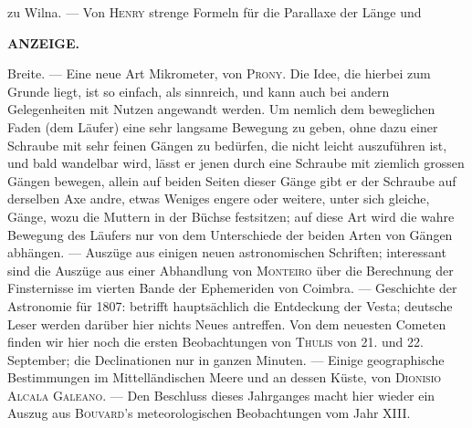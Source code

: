 zu Wilna. --- Von \textsc{Henry} strenge Formeln für die Parallaxe der Länge und\par
\clearpage
\thispagestyle{empty}
\noindent{}%
%
\parbox[t]{\dimexpr\linewidth-24mm\relax}{\centering\footnotesize\bfseries ANZEIGE.\par}%
\makebox[12mm][r]{}\par\nobreak\medskip
\noindent Breite. --- Eine neue Art Mikrometer, von \textsc{Prony}. Die Idee, die hierbei zum Grunde liegt, ist so einfach, als sinnreich, und kann auch bei andern Gelegenheiten mit Nutzen angewandt werden. Um nemlich dem beweglichen Faden (dem Läufer) eine sehr langsame Bewegung zu geben, ohne dazu einer Schraube mit sehr feinen Gängen zu bedürfen, die nicht leicht auszuführen ist, und bald wandelbar wird, lässt er jenen durch eine Schraube mit ziemlich grossen Gängen bewegen, allein auf beiden Seiten dieser Gänge gibt er der Schraube auf derselben Axe andre, etwas Weniges engere oder weitere, unter sich gleiche, Gänge, wozu die Muttern in der Büchse festsitzen; auf diese Art wird die wahre Bewegung des Läufers nur von dem Unterschiede der beiden Arten von Gängen abhängen. --- Auszüge aus einigen neuen astronomischen Schriften; interessant sind die Auszüge aus einer Abhandlung von \textsc{Monteiro} über die Berechnung der Finsternisse im vierten Bande der Ephemeriden von Coimbra. --- Geschichte der Astronomie für 1807: betrifft hauptsächlich die Entdeckung der Vesta; deutsche Leser werden darüber hier nichts Neues antreffen. Von dem neuesten Cometen finden wir hier noch die ersten Beobachtungen von \textsc{Thulis} von 21. und 22. September; die Declinationen nur in ganzen Minuten. --- Einige geographische Bestimmungen im Mittelländischen Meere und an dessen Küste, von \textsc{Dionisio Alcala Galeano}. --- Den Beschluss dieses Jahrganges macht hier wieder ein Auszug aus \textsc{Bouvard}'s meteorologischen Beobachtungen vom Jahr XIII.
